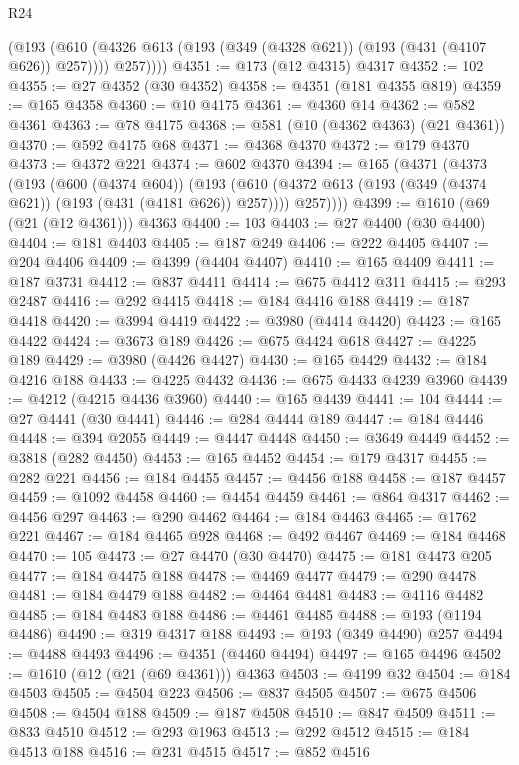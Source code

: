 \begin{lexlean}{R24}
\begin{coremodule}
          (@193
            (@610 (@4326 @613 (@193 (@349 (@4328 @621)) (@193 (@431 (@4107 @626)) @257))))
            @257))))
@4351 := @173 (@12 @4315) @4317
@4352 := 102
@4355 := @27 @4352 (@30 @4352)
@4358 := @4351 (@181 @4355 @819)
@4359 := @165 @4358
@4360 := @10 @4175
@4361 := @4360 @14
@4362 := @582 @4361
@4363 := @78 @4175
@4368 := @581 (@10 (@4362 @4363) (@21 @4361))
@4370 := @592 @4175 @68
@4371 := @4368 @4370
@4372 := @179 @4370
@4373 := @4372 @221
@4374 := @602 @4370
@4394 := @165
    (@4371
      (@4373
        (@193
          (@600 (@4374 @604))
          (@193
            (@610 (@4372 @613 (@193 (@349 (@4374 @621)) (@193 (@431 (@4181 @626)) @257))))
            @257))))
@4399 := @1610 (@69 (@21 (@12 @4361))) @4363
@4400 := 103
@4403 := @27 @4400 (@30 @4400)
@4404 := @181 @4403
@4405 := @187 @249
@4406 := @222 @4405
@4407 := @204 @4406
@4409 := @4399 (@4404 @4407)
@4410 := @165 @4409
@4411 := @187 @3731
@4412 := @837 @4411
@4414 := @675 @4412 @311
@4415 := @293 @2487
@4416 := @292 @4415
@4418 := @184 @4416 @188
@4419 := @187 @4418
@4420 := @3994 @4419
@4422 := @3980 (@4414 @4420)
@4423 := @165 @4422
@4424 := @3673 @189
@4426 := @675 @4424 @618
@4427 := @4225 @189
@4429 := @3980 (@4426 @4427)
@4430 := @165 @4429
@4432 := @184 @4216 @188
@4433 := @4225 @4432
@4436 := @675 @4433 @4239 @3960
@4439 := @4212 (@4215 @4436 @3960)
@4440 := @165 @4439
@4441 := 104
@4444 := @27 @4441 (@30 @4441)
@4446 := @284 @4444 @189
@4447 := @184 @4446
@4448 := @394 @2055
@4449 := @4447 @4448
@4450 := @3649 @4449
@4452 := @3818 (@282 @4450)
@4453 := @165 @4452
@4454 := @179 @4317
@4455 := @282 @221
@4456 := @184 @4455
@4457 := @4456 @188
@4458 := @187 @4457
@4459 := @1092 @4458
@4460 := @4454 @4459
@4461 := @864 @4317
@4462 := @4456 @297
@4463 := @290 @4462
@4464 := @184 @4463
@4465 := @1762 @221
@4467 := @184 @4465 @928
@4468 := @492 @4467
@4469 := @184 @4468
@4470 := 105
@4473 := @27 @4470 (@30 @4470)
@4475 := @181 @4473 @205
@4477 := @184 @4475 @188
@4478 := @4469 @4477
@4479 := @290 @4478
@4481 := @184 @4479 @188
@4482 := @4464 @4481
@4483 := @4116 @4482
@4485 := @184 @4483 @188
@4486 := @4461 @4485
@4488 := @193 (@1194 @4486)
@4490 := @319 @4317 @188
@4493 := @193 (@349 @4490) @257
@4494 := @4488 @4493
@4496 := @4351 (@4460 @4494)
@4497 := @165 @4496
@4502 := @1610 (@12 (@21 (@69 @4361))) @4363
@4503 := @4199 @32
@4504 := @184 @4503
@4505 := @4504 @223
@4506 := @837 @4505
@4507 := @675 @4506
@4508 := @4504 @188
@4509 := @187 @4508
@4510 := @847 @4509
@4511 := @833 @4510
@4512 := @293 @1963
@4513 := @292 @4512
@4515 := @184 @4513 @188
@4516 := @231 @4515
@4517 := @852 @4516

\end{coremodule}
\end{lexlean}
